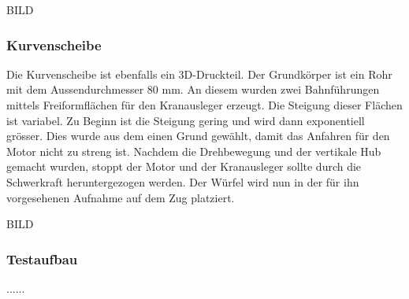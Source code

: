 \documentclass[../../main.tex]{subfiles}
\begin{document}
BILD

        \subsubsection{Kurvenscheibe}
        Die Kurvenscheibe ist ebenfalls ein 3D-Druckteil. Der Grundkörper ist ein Rohr mit dem Aussendurchmesser 80 mm. An diesem wurden zwei Bahnführungen mittels Freiformflächen für den Kranausleger erzeugt. Die Steigung dieser Flächen ist variabel. Zu Beginn ist die Steigung gering und wird dann exponentiell grösser. Dies wurde aus dem einen Grund gewählt, damit das Anfahren für den Motor nicht zu streng ist. Nachdem die Drehbewegung und der vertikale Hub gemacht wurden, stoppt der Motor und der Kranausleger sollte durch die Schwerkraft heruntergezogen werden. Der Würfel wird nun in der für ihn vorgesehenen Aufnahme auf dem Zug platziert.


BILD



        \subsubsection{Testaufbau}
        ......


    
\end{document}
